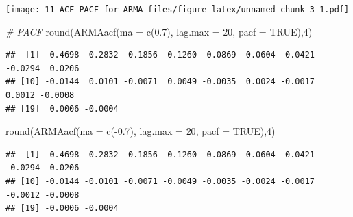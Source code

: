 \documentclass[
]{book}
\newenvironment{Shaded}{\begin{snugshade}}{\end{snugshade}}
\newcommand{\AttributeTok}[1]{\textcolor[rgb]{0.77,0.63,0.00}{#1}}
\newcommand{\CommentTok}[1]{\textcolor[rgb]{0.56,0.35,0.01}{\textit{#1}}}
\newcommand{\ConstantTok}[1]{\textcolor[rgb]{0.00,0.00,0.00}{#1}}
\newcommand{\DecValTok}[1]{\textcolor[rgb]{0.00,0.00,0.81}{#1}}
\newcommand{\FloatTok}[1]{\textcolor[rgb]{0.00,0.00,0.81}{#1}}
\newcommand{\FunctionTok}[1]{\textcolor[rgb]{0.00,0.00,0.00}{#1}}
\newcommand{\NormalTok}[1]{#1}
\newcommand{\SpecialCharTok}[1]{\textcolor[rgb]{0.00,0.00,0.00}{#1}}
\theoremstyle{definition}
\theoremstyle{definition}
\theoremstyle{definition}
\theoremstyle{definition}
\theoremstyle{remark}
\begin{document}
\texttt{[image: 11-ACF-PACF-for-ARMA\_files/figure-latex/unnamed-chunk-3-1.pdf]}

\begin{Shaded}
\begin{Highlighting}[]
\CommentTok{\# PACF}
\FunctionTok{round}\NormalTok{(}\FunctionTok{ARMAacf}\NormalTok{(}\AttributeTok{ma =} \FunctionTok{c}\NormalTok{(}\FloatTok{0.7}\NormalTok{), }\AttributeTok{lag.max =} \DecValTok{20}\NormalTok{, }\AttributeTok{pacf =} \ConstantTok{TRUE}\NormalTok{),}\DecValTok{4}\NormalTok{)}
\end{Highlighting}
\end{Shaded}

\begin{verbatim}
##  [1]  0.4698 -0.2832  0.1856 -0.1260  0.0869 -0.0604  0.0421 -0.0294  0.0206
## [10] -0.0144  0.0101 -0.0071  0.0049 -0.0035  0.0024 -0.0017  0.0012 -0.0008
## [19]  0.0006 -0.0004
\end{verbatim}

\begin{Shaded}
\begin{Highlighting}[]
\FunctionTok{round}\NormalTok{(}\FunctionTok{ARMAacf}\NormalTok{(}\AttributeTok{ma =} \FunctionTok{c}\NormalTok{(}\SpecialCharTok{{-}}\FloatTok{0.7}\NormalTok{), }\AttributeTok{lag.max =} \DecValTok{20}\NormalTok{, }\AttributeTok{pacf =} \ConstantTok{TRUE}\NormalTok{),}\DecValTok{4}\NormalTok{) }
\end{Highlighting}
\end{Shaded}

\begin{verbatim}
##  [1] -0.4698 -0.2832 -0.1856 -0.1260 -0.0869 -0.0604 -0.0421 -0.0294 -0.0206
## [10] -0.0144 -0.0101 -0.0071 -0.0049 -0.0035 -0.0024 -0.0017 -0.0012 -0.0008
## [19] -0.0006 -0.0004
\end{verbatim}
\end{document}
